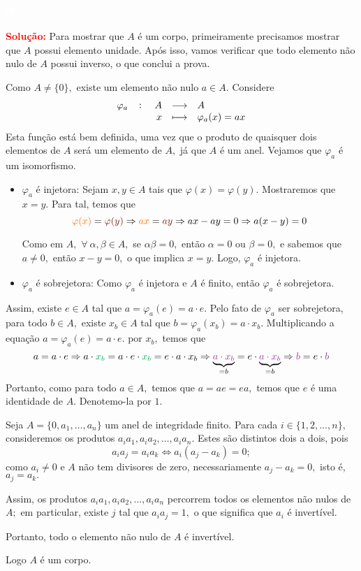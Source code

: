 \documentclass[11pt,a4paper]{article}
\newcommand{\solucao}[1]{
\textbf{\textcolor{white}{oi}\\ \\ \textcolor{red}{Solução:}} #1}
\begin{document}
\solucao{
Para mostrar que $A$ é um corpo, primeiramente precisamos mostrar que $A$ possui elemento unidade. Após isso, vamos verificar que todo elemento não nulo de $A$ possui inverso, o que conclui a prova.

Como $A \neq \{ 0 \},$ existe um elemento não nulo $a \in A.$ Considere
\[
\fullfunction{\varphi_a}{A}{A}{x}{\varphi_a(x) = ax}
\]
Esta função está bem definida, uma vez que o produto de quaisquer dois elementos de $A$ será um elemento de $A,$ já que $A$ é um anel. Vejamos que $\varphi_a$ é um isomorfismo.
\begin{itemize}
    \item $\varphi_a$ é injetora: Sejam $x, y \in A$ tais que $\varphi(x) = \varphi(y).$ Mostraremos que $x = y.$ Para tal, temos que
    \[
    \textcolor{Laranja}{\varphi(x)} = \textcolor{Brown}{\varphi(y)}  \Rightarrow     \textcolor{Laranja}{ax} = \textcolor{Brown}{ay} \Rightarrow ax - ay = 0 \Rightarrow a(x-y) = 0
    \]
    
    Como em $A,$ $\forall \ \alpha, \beta \in A,$ se $\alpha \beta = 0,$ então $\alpha = 0$ ou $\beta = 0,$ e sabemos que $a \neq 0,$ então $x - y = 0,$ o que implica $x=y.$ Logo, $\varphi_a$ é injetora.

    \item $\varphi_a$ é sobrejetora: Como $\varphi_a$ é injetora e $A$ é finito, então $\varphi_a$ é sobrejetora.
\end{itemize}
Assim, existe $e \in A$ tal que $a = \varphi_a(e) = a \cdot e.$ Pelo fato de $\varphi_a$ ser sobrejetora, para todo $b \in A,$ existe $x_b \in A$ tal que $b = \varphi_a(x_b) = a \cdot x_b.$ Multiplicando a equação $a = \varphi_a(e) = a \cdot e.$ por $x_b,$ temos que
\[
a = a \cdot e \Rightarrow a \cdot \textcolor{Green}{x_b} = a \cdot e \cdot \textcolor{Green}{x_b} = e \cdot a \cdot x_b \Rightarrow \underbrace{\textcolor{Purple}{a \cdot x_b}}_{=b} = e \cdot \underbrace{\textcolor{Purple}{a \cdot x_b}}_{=b} \Rightarrow \textcolor{Purple}{b} = e \cdot \textcolor{Purple}{b}
\]
Portanto, como para todo $a \in A,$ temos que $a = ae = ea,$ temos que $e$ é uma identidade de $A.$ Denotemo-la por $1.$

Seja $A = \{0, a_1, \ldots, a_n \}$ um anel de integridade finito. Para cada $i \in \{ 1 , 2 , \ldots , n\},$ consideremos os produtos $a_ia_1, a_ia_2, \ldots , a_ia_n.$ Estes são distintos dois a dois, pois 
\[a_ia_j = a_ia_k \Leftrightarrow a_i(a_j - a_k) = 0;\] como $a_i \neq 0$ e $A$ não tem divisores de zero, necessariamente $a_j - a_k = 0,$ isto é, $a_j = a_k.$

Assim, os produtos $a_ia_1, a_ia_2, \ldots , a_ia_n$ percorrem todos os elementos não nulos de $A;$ em particular, existe $j$ tal que $a_ia_j = 1,$ o que significa que $a_i$ é invertível.

Portanto, todo o elemento não nulo de $A$ é invertível. 

Logo $A$ é um corpo.

}
\end{document}

